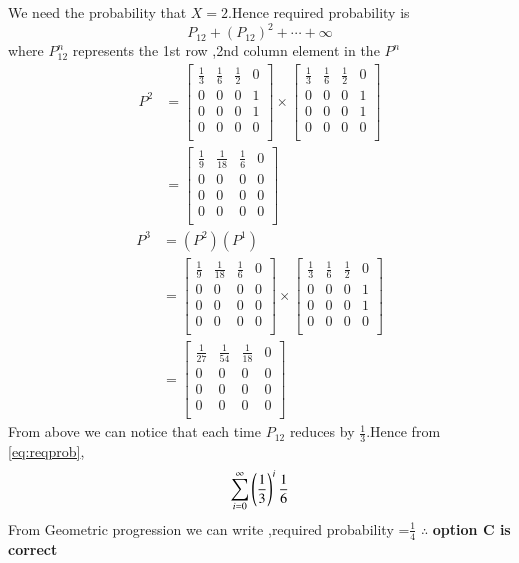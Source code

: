 \documentclass[journal,12pt,twocolumn]{IEEEtran}
\begin{document}
We need the probability that $X=2$.Hence required probability is
\begin{equation}
    P_{12}+(P_{12})^{2}+\cdots+\infty \label{eq:reqprob}
\end{equation}
where $P_{12}^{n}$ represents the 1st row ,2nd column element in the $P^{n}$
\begin{align}
P^2&=\begin{bmatrix}
\frac{1}{3}&\frac{1}{6}&\frac{1}{2}&0\\
0&0&0&1\\
0&0&0&1\\
0&0&0&0\\
\end{bmatrix} \times
\begin{bmatrix}
\frac{1}{3}&\frac{1}{6}&\frac{1}{2}&0\\
0&0&0&1\\
0&0&0&1\\
0&0&0&0\\
\end{bmatrix}\\
&=\begin{bmatrix}
\frac{1}{9}&\frac{1}{18}&\frac{1}{6}&0\\
0&0&0&0\\
0&0&0&0\\
0&0&0&0\\
\end{bmatrix}
\end{align}
\begin{align}
    P^3&=(P^2)(P^1)\\
    &=\begin{bmatrix}
\frac{1}{9}&\frac{1}{18}&\frac{1}{6}&0\\
0&0&0&0\\
0&0&0&0\\
0&0&0&0\\
\end{bmatrix}\times
\begin{bmatrix}
\frac{1}{3}&\frac{1}{6}&\frac{1}{2}&0\\
0&0&0&1\\
0&0&0&1\\
0&0&0&0\\
\end{bmatrix}\\
&=\begin{bmatrix}
\frac{1}{27}&\frac{1}{54}&\frac{1}{18}&0\\
0&0&0&0\\
0&0&0&0\\
0&0&0&0\\
\end{bmatrix}
\end{align}
From above we can notice that each time $P_{12}$ reduces by $\frac{1}{3}$.Hence from \eqref{eq:reqprob},
\begin{equation}
    \sum_{i=0}^{\infty}\left(\frac{1}{3}\right)^i \frac{1}{6}
\end{equation}
From Geometric progression we can write ,required probability =$\frac{1}{4}$
$\therefore$ \textbf{option C is correct}
\end{document}
